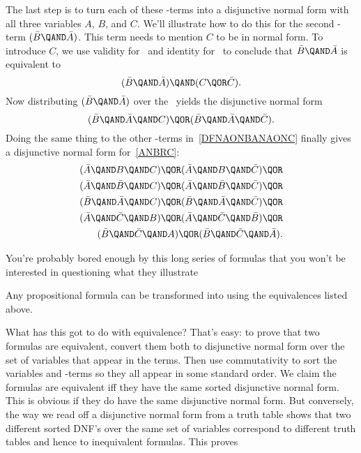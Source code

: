 The last step is to turn each of these \QAND-terms into a disjunctive
normal form with all three variables $A$, $B$, and $C$.  We'll
illustrate how to do this for the second \QAND-term
$(\bar{B} \QAND \bar{A})$.  This term needs to mention $C$ to be in
normal form.  To introduce $C$, we use validity for \QOR\ and
identity for \QAND\ to conclude that $\bar{B} \QAND \bar{A}$
is equivalent to
\[
(\bar{B} \QAND \bar{A}) \QAND (C \QOR \bar{C}).
\]
Now distributing $(\bar{B} \QAND \bar{A})$ over the \QOR\ yields the
disjunctive normal form
\[
(\bar{B} \QAND \bar{A} \QAND C) \QOR
(\bar{B} \QAND \bar{A} \QAND \bar{C}).
\]
Doing the same thing to the other \QAND-terms in~\eqref{DFNAONBANAONC}
finally gives a disjunctive normal form for~\eqref{ANBRC}:
\begin{align*}
(\bar{A} \QAND B \QAND C) \QOR (\bar{A} \QAND B \QAND \bar{C}) \QOR\\
(\bar{A} \QAND \bar{B} \QAND C) \QOR (\bar{A} \QAND \bar{B} \QAND \bar{C}) \QOR\\
(\bar{B} \QAND \bar{A} \QAND C) \QOR (\bar{B} \QAND \bar{A} \QAND \bar{C}) \QOR\\
(\bar{A} \QAND \bar{C} \QAND B) \QOR (\bar{A} \QAND \bar{C} \QAND \bar{B}) \QOR\\
(\bar{B} \QAND \bar{C} \QAND A) \QOR (\bar{B} \QAND \bar{C} \QAND \bar{A}).
\end{align*}

You're probably bored enough by this long series of formulas that you
won't be interested in questioning what they illustrate

\begin{theorem}\label{completeDNF}
Any propositional formula can be transformed into  using the equivalences listed above.
\end{theorem}

What has this got to do with equivalence?  That's easy: to prove that two
formulas are equivalent, convert them both to disjunctive normal form over
the set of variables that appear in the terms.  Then use commutativity to
sort the variables and \QAND-terms so they all appear in some standard
order.  We claim the formulas are equivalent iff they have the same sorted
disjunctive normal form.  This is obvious if they do have the same
disjunctive normal form.  But conversely, the way we read off a
disjunctive normal form from a truth table shows that two different sorted
DNF's over the same set of variables correspond to different truth tables
and hence to inequivalent formulas.  This proves

